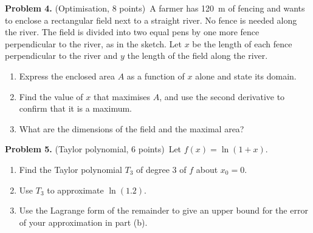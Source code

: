 \documentclass[11pt,a4paper]{article}
\newcommand{\problem}[3]{\bigskip\par\textbf{Problem #1.} (#2, #3 points)\ }
\begin{document}
\problem{4}{Optimisation}{8}A farmer has \SI{120}{m} of fencing and wants to enclose a rectangular
field next to a straight river. No fence is needed along the river. The field is divided into two equal
pens by one more fence perpendicular to the river, as in the sketch. Let $x$ be the length of each
fence perpendicular to the river and $y$ the length of the field along the river.

\begin{center}
\end{center}
\begin{enumerate}
  \item Express the enclosed area $A$ as a function of $x$ alone and state its domain.
  \item Find the value of $x$ that maximises $A$, and use the second derivative to confirm that it is a
        maximum.
  \item What are the dimensions of the field and the maximal area?
\end{enumerate}

\problem{5}{Taylor polynomial}{6}Let $f(x) = \ln(1+x)$.
\begin{enumerate}
  \item Find the Taylor polynomial $T_3$ of degree $3$ of $f$ about $x_0 = 0$.
  \item Use $T_3$ to approximate $\ln(1.2)$.
  \item Use the Lagrange form of the remainder to give an upper bound for the error of your
        approximation in part (b).
\end{enumerate}
\end{document}
